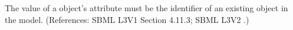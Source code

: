 The value of a \SpeciesReference object's  attribute must be
the identifier of an existing \Species object in the model.  (References:
SBML L3V1 Section 4.11.3; SBML L3V2 .)
